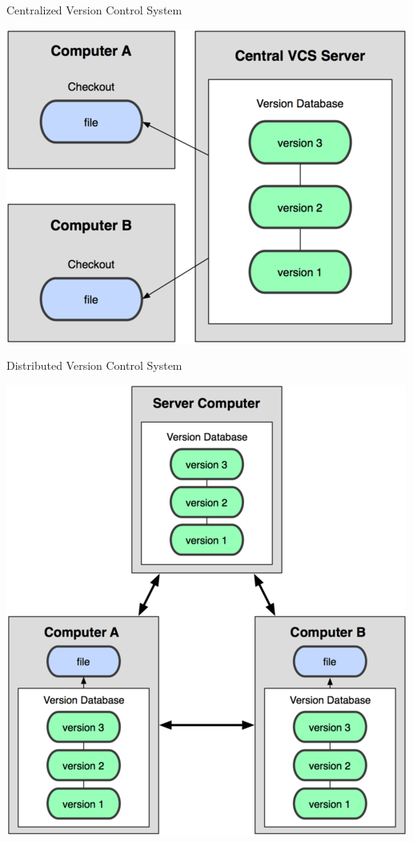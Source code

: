 \documentclass[14pt]{beamer}
\begin{document}
\begin{frame}{Centralized Version Control System}
  \begin{center}
    \includegraphics[scale=0.45]{CentralizedVCS.png}
  \end{center}
\end{frame}

\begin{frame}{Distributed Version Control System}
  \begin{center}
\includegraphics[scale=0.38]{DistributedVCS.png}
  \end{center}
\end{frame}
\end{document}
